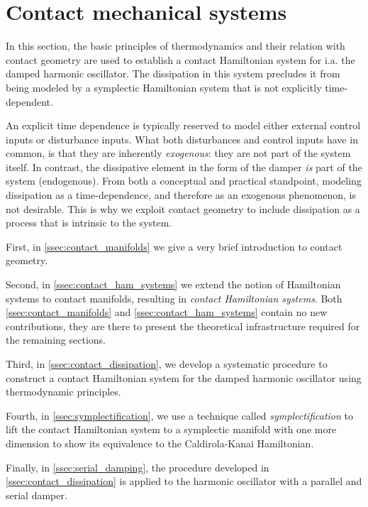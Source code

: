 \section{Contact mechanical systems}
\label{sec:contact}

In this section, the basic principles of thermodynamics and their relation with contact geometry are used to establish a contact Hamiltonian system for i.a. the damped harmonic oscillator. The dissipation in this system precludes it from being modeled by a symplectic Hamiltonian system that is not explicitly time-dependent. 

An explicit time dependence is typically reserved to model either external control inputs or disturbance inputs.%
What both disturbances and control inputs have in common, is that they are inherently \emph{exogenous}: they are not part of the system itself. In contrast, the dissipative element in the form of the damper \emph{is} part of the system (endogenous). From both a conceptual and practical standpoint, modeling dissipation as a time-dependence, and therefore as an exogenous phenomenon, is not desirable. This is why we exploit contact geometry to include dissipation as a process that is intrinsic to the system.

First, in \cref{ssec:contact_manifolds} we give a very brief introduction to contact geometry. 

Second, in \cref{ssec:contact_ham_systems} we extend the notion of Hamiltonian systems to contact manifolds, resulting in \emph{contact Hamiltonian systems}. Both \cref{ssec:contact_manifolds} and \cref{ssec:contact_ham_systems} contain no new contributions, they are there to present the theoretical infrastructure required for the remaining sections.

Third, in \cref{ssec:contact_dissipation}, we develop a systematic procedure to construct a contact Hamiltonian system for the damped harmonic oscillator using thermodynamic principles.

Fourth, in \cref{ssec:symplectification}, we use a technique called \emph{symplectification} to lift the contact Hamiltonian system to a symplectic manifold with one more dimension to show its equivalence to the Caldirola-Kanai Hamiltonian.

Finally, in \cref{ssec:serial_damping}, the procedure developed in \cref{ssec:contact_dissipation} is applied to the harmonic oscillator with a parallel and serial damper.

